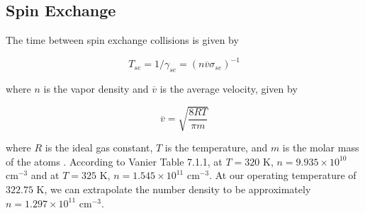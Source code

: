 \subsection{Spin Exchange}

The time between spin exchange collisions is given by

\begin{equation}
T_{se} = 1/\gamma_{se} = (n\overline{v}\sigma_{se})^{-1}
\end{equation}

where $n$ is the vapor density and $\overline{v}$ is the average velocity, given by

\begin{equation}
\overline{v} = \sqrt{\frac{8RT}{\pi m}}
\end{equation}

where $R$ is the ideal gas constant, $T$ is the temperature, and $m$
is the molar mass of the atoms \cite{vanier}. According to Vanier
Table 7.1.1, at $T = 320$ K, $n = 9.935\times 10^{10}$ cm$^{-3}$ and
at $T = 325$ K, $n = 1.545\times 10^{11}$ cm$^{-3}$. At our operating
temperature of $322.75$ K, we can extrapolate the number density to be
approximately  $n = 1.297\times 10^{11}$ cm$^{-3}$. 



